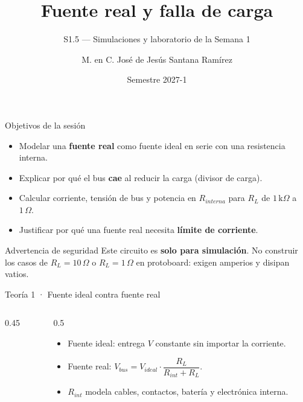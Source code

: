\documentclass[aspectratio=169]{beamer}
\title[S1.5 · Fuente real]{Fuente real y falla de carga}
\subtitle{S1.5 — Simulaciones y laboratorio de la Semana 1}
\institute{Licenciatura en Ingeniería Aeroespacial\\ UNAM · ENES Unidad Juriquilla}
\author{M. en C. José de Jesús Santana Ramírez}
\date{Semestre 2027-1}
\begin{document}
\begin{frame}[plain]
  \titlepage
\end{frame}

\begin{frame}{Objetivos de la sesión}
  \begin{itemize}
    \item Modelar una \textbf{fuente real} como fuente ideal en serie con una resistencia interna.
    \item Explicar por qué el bus \textbf{cae} al reducir la carga (divisor de carga).
    \item Calcular corriente, tensión de bus y potencia en $R_{interna}$ para $R_L$ de $1\,\text{k}\Omega$ a $1\,\Omega$.
    \item Justificar por qué una fuente real necesita \textbf{límite de corriente}.
  \end{itemize}
  \pause
  \begin{alertblock}{Advertencia de seguridad}
    Este circuito es \textbf{solo para simulación}. No construir los casos de
    $R_L = 10\,\Omega$ o $R_L = 1\,\Omega$ en protoboard: exigen amperios y disipan vatios.
  \end{alertblock}
\end{frame}

\begin{frame}{Teoría 1 · Fuente ideal contra fuente real}
  \begin{columns}[T]
    \begin{column}{0.45\textwidth}
    \end{column}
    \begin{column}{0.5\textwidth}
      \begin{itemize}
        \item Fuente ideal: entrega $V$ constante sin importar la corriente.
        \item Fuente real: $V_{bus} = V_{ideal}\cdot\dfrac{R_L}{R_{int}+R_L}$.
        \item $R_{int}$ modela cables, contactos, batería y electrónica interna.
      \end{itemize}
    \end{column}
  \end{columns}
\end{frame}
\end{document}
